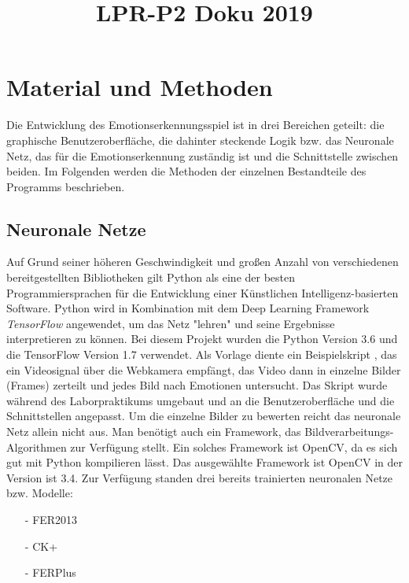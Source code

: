 \documentclass[10pt,a4paper]{report}
\title{LPR-P2 Doku 2019}
\begin{document}
\chapter{Material und Methoden}
Die Entwicklung des Emotionserkennungsspiel ist in drei Bereichen geteilt:
die graphische Benutzeroberfläche, die dahinter steckende Logik bzw. das
Neuronale Netz, das für die Emotionserkennung zuständig ist und die Schnittstelle
zwischen beiden. Im Folgenden werden die Methoden der einzelnen Bestandteile
des Programms beschrieben. 
\section{Neuronale Netze}
\label{subsec:statistical-summaries}
Auf Grund seiner höheren Geschwindigkeit und großen Anzahl von verschiedenen
bereitgestellten Bibliotheken gilt Python als eine der besten Programmiersprachen
für die Entwicklung einer Künstlichen Intelligenz-basierten Software.
\newline
Python wird in Kombination mit dem Deep Learning Framework  \textit{TensorFlow} angewendet, um das Netz "lehren" und seine Ergebnisse interpretieren zu können.
Bei diesem Projekt wurden die Python Version 3.6 und die TensorFlow Version
1.7 verwendet.
 \newline
Als Vorlage diente ein Beispielskript \cite{LeweOhlsenGit}, das ein Videosignal über die Webkamera
empfängt, das Video dann in einzelne Bilder (Frames) zerteilt und jedes Bild
nach Emotionen untersucht. Das Skript wurde während des Laborpraktikums
umgebaut und an die Benutzeroberfläche und die Schnittstellen angepasst.\newline
Um die einzelne Bilder zu bewerten reicht das neuronale Netz allein nicht aus. Man
benötigt auch ein Framework, das Bildverarbeitungs-Algorithmen zur Verfügung
stellt. Ein solches Framework ist OpenCV, da es sich gut mit Python kompilieren lässt.
Das ausgewählte Framework ist OpenCV in der Version ist 3.4.
 \newline
Zur Verfügung standen drei bereits trainierten neuronalen Netze bzw. Modelle: \newline
\begin{itemize}
\item[-]  FER2013 \cite{IasGoodefellow}
\item[-] CK+
\item[-] FERPlus \newline
\end{itemize}
 
\end{document}
